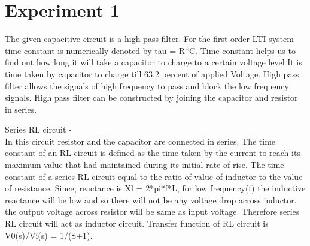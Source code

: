 \section{Experiment 1}
The given capacitive circuit is a high pass filter. 
For the first order LTI system time constant is numerically denoted by tau = R*C. 
Time constant helps us to find out how long it will take a capacitor to charge to a certain voltage level
It is time taken by capacitor to charge till 63.2 percent of applied Voltage.
High pass filter allows the signals of high frequency to pass and block the low frequency signals. High pass filter can be constructed by joining the capacitor and resistor in series. 

Series RL circuit - \\
In this circuit resistor and the capacitor are connected in series.
The time constant of an RL circuit is defined as the time taken by the current to reach its maximum value that had maintained during its initial rate of rise.
The time constant of a series RL circuit equal to the ratio of value of inductor to the value of resistance.
Since, reactance is Xl = 2*pi*f*L, for low frequency(f) the inductive reactance will be low and 
so there will not be any voltage drop across inductor, the output voltage across resistor
will be same as input voltage. Therefore series RL circuit will act as inductor circuit.
Transfer function of RL circuit is V0(s)/Vi(s) = 1/(S+1). 
